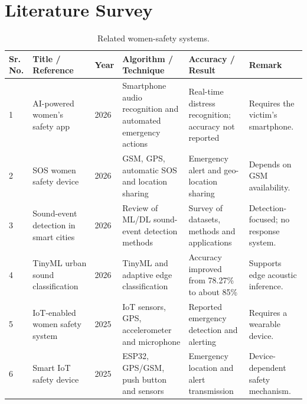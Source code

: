 \documentclass[conference]{IEEEtran}
\renewcommand{\arraystretch}{1.10}
\begin{document}
\section{Literature Survey}
\label{sec:related}
\begin{table}[!t]
  \centering
  \caption{Related women-safety systems.}
  \label{tab:literature}

  \scriptsize
  \setlength{\tabcolsep}{1.5pt}
  \renewcommand{\arraystretch}{1.0}

  \begin{tabular}{|
  p{0.7cm}|
  p{3.9cm}|
  p{1.0cm}|
  p{3.6cm}|
  p{3.5cm}|
  p{3.8cm}|}
  \hline

  \textbf{Sr. No.} &
  \textbf{Title / Reference} &
  \textbf{Year} &
  \textbf{Algorithm / Technique} &
  \textbf{Accuracy / Result} &
  \textbf{Remark}
  \\ \hline

  1 &
  AI-powered women's safety app~\cite{pavithra2026} &
  2026 &
  Smartphone audio recognition and automated emergency actions &
  Real-time distress recognition; accuracy not reported &
  Requires the victim's smartphone.
  \\ \hline

  2 &
  SOS women safety device~\cite{potturi2026} &
  2026 &
  GSM, GPS, automatic SOS and location sharing &
  Emergency alert and geo-location sharing &
  Depends on GSM availability.
  \\ \hline

  3 &
  Sound-event detection in smart cities~\cite{ciaburro2026} &
  2026 &
  Review of ML/DL sound-event detection methods &
  Survey of datasets, methods and applications &
  Detection-focused; no response system.
  \\ \hline

  4 &
  TinyML urban sound classification~\cite{trigkas2026} &
  2026 &
  TinyML and adaptive edge classification &
  Accuracy improved from 78.27\% to about 85\% &
  Supports edge acoustic inference.
  \\ \hline

  5 &
  IoT-enabled women safety system~\cite{bharathi2025} &
  2025 &
  IoT sensors, GPS, accelerometer and microphone &
  Reported emergency detection and alerting &
  Requires a wearable device.
  \\ \hline

  6 &
  Smart IoT safety device~\cite{snehith2025} &
  2025 &
  ESP32, GPS/GSM, push button and sensors &
  Emergency location and alert transmission &
  Device-dependent safety mechanism.
  \\ \hline


\end{tabular}
\end{table}
\end{document}

